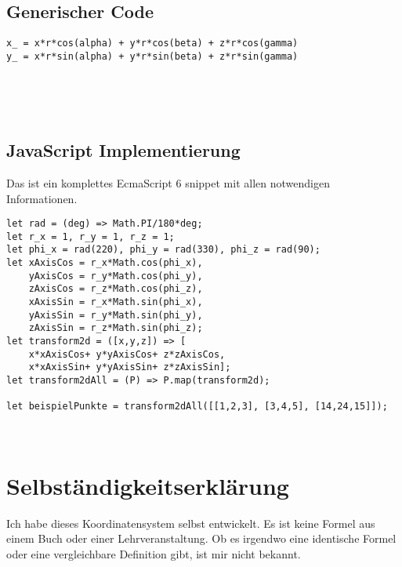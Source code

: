 \documentclass[a4paper]{article}
\begin{document}
\begin{example}
\subsection{Generischer Code}

\begin{example}
\begin{lstlisting}
x_ = x*r*cos(alpha) + y*r*cos(beta) + z*r*cos(gamma)
y_ = x*r*sin(alpha) + y*r*sin(beta) + z*r*sin(gamma)
\end{lstlisting}\\

\end{example}\\

\subsection{JavaScript Implementierung}

\begin{example}
Das ist ein komplettes EcmaScript 6 snippet mit allen notwendigen Informationen.\\
\begin{lstlisting}
let rad = (deg) => Math.PI/180*deg;
let r_x = 1, r_y = 1, r_z = 1; 
let phi_x = rad(220), phi_y = rad(330), phi_z = rad(90); 
let xAxisCos = r_x*Math.cos(phi_x), 
    yAxisCos = r_y*Math.cos(phi_y),
    zAxisCos = r_z*Math.cos(phi_z),
    xAxisSin = r_x*Math.sin(phi_x), 
    yAxisSin = r_y*Math.sin(phi_y),
    zAxisSin = r_z*Math.sin(phi_z);
let transform2d = ([x,y,z]) => [
    x*xAxisCos+ y*yAxisCos+ z*zAxisCos,
    x*xAxisSin+ y*yAxisSin+ z*zAxisSin];
let transform2dAll = (P) => P.map(transform2d);

let beispielPunkte = transform2dAll([[1,2,3], [3,4,5], [14,24,15]]);
\end{lstlisting}
\end{example}\\


\section{Selbst\"andigkeitserkl\"arung}

Ich habe dieses Koordinatensystem selbst entwickelt. Es ist keine Formel aus einem Buch oder einer Lehrveranstaltung.
Ob es irgendwo eine identische Formel oder eine vergleichbare Definition gibt, ist mir nicht bekannt.\\


\end{example}
\end{document}
